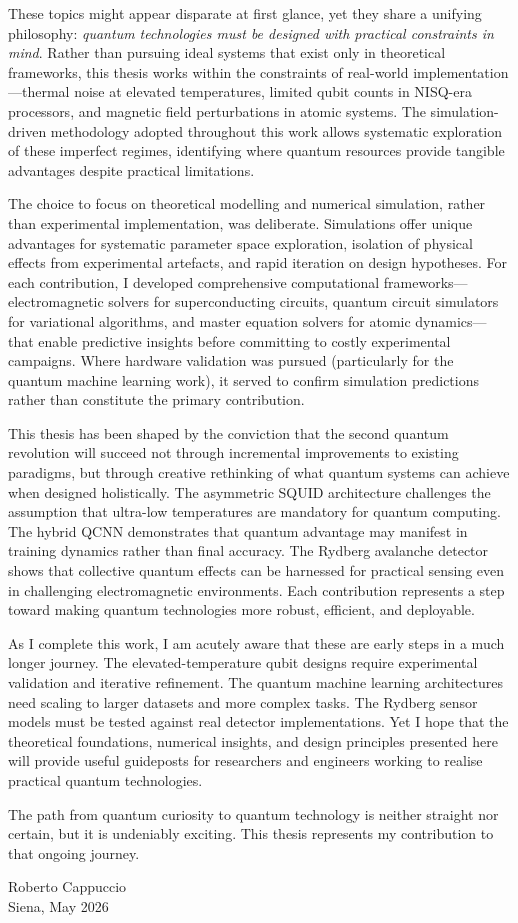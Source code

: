 These topics might appear disparate at first glance, yet they share a unifying philosophy: \emph{quantum technologies must be designed with practical constraints in mind}. Rather than pursuing ideal systems that exist only in theoretical frameworks, this thesis works within the constraints of real-world implementation---thermal noise at elevated temperatures, limited qubit counts in NISQ-era processors, and magnetic field perturbations in atomic systems. The simulation-driven methodology adopted throughout this work allows systematic exploration of these imperfect regimes, identifying where quantum resources provide tangible advantages despite practical limitations.

The choice to focus on theoretical modelling and numerical simulation, rather than experimental implementation, was deliberate. Simulations offer unique advantages for systematic parameter space exploration, isolation of physical effects from experimental artefacts, and rapid iteration on design hypotheses. For each contribution, I developed comprehensive computational frameworks---electromagnetic solvers for superconducting circuits, quantum circuit simulators for variational algorithms, and master equation solvers for atomic dynamics---that enable predictive insights before committing to costly experimental campaigns. Where hardware validation was pursued (particularly for the quantum machine learning work), it served to confirm simulation predictions rather than constitute the primary contribution.

This thesis has been shaped by the conviction that the second quantum revolution will succeed not through incremental improvements to existing paradigms, but through creative rethinking of what quantum systems can achieve when designed holistically. The asymmetric SQUID architecture challenges the assumption that ultra-low temperatures are mandatory for quantum computing. The hybrid QCNN demonstrates that quantum advantage may manifest in training dynamics rather than final accuracy. The Rydberg avalanche detector shows that collective quantum effects can be harnessed for practical sensing even in challenging electromagnetic environments. Each contribution represents a step toward making quantum technologies more robust, efficient, and deployable.

As I complete this work, I am acutely aware that these are early steps in a much longer journey. The elevated-temperature qubit designs require experimental validation and iterative refinement. The quantum machine learning architectures need scaling to larger datasets and more complex tasks. The Rydberg sensor models must be tested against real detector implementations. Yet I hope that the theoretical foundations, numerical insights, and design principles presented here will provide useful guideposts for researchers and engineers working to realise practical quantum technologies.

The path from quantum curiosity to quantum technology is neither straight nor certain, but it is undeniably exciting. This thesis represents my contribution to that ongoing journey.

\vspace{1cm}
\begin{flushright}
Roberto Cappuccio\\
Siena, May 2026
\end{flushright}

